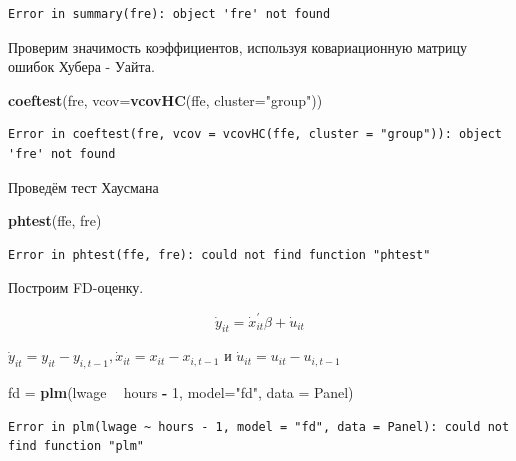 \documentclass[]{book}
\newenvironment{Shaded}{\begin{snugshade}}{\end{snugshade}}
\newcommand{\DataTypeTok}[1]{\textcolor[rgb]{0.13,0.29,0.53}{#1}}
\newcommand{\DecValTok}[1]{\textcolor[rgb]{0.00,0.00,0.81}{#1}}
\newcommand{\KeywordTok}[1]{\textcolor[rgb]{0.13,0.29,0.53}{\textbf{#1}}}
\newcommand{\NormalTok}[1]{#1}
\newcommand{\OperatorTok}[1]{\textcolor[rgb]{0.81,0.36,0.00}{\textbf{#1}}}
\newcommand{\StringTok}[1]{\textcolor[rgb]{0.31,0.60,0.02}{#1}}
\begin{document}
\begin{verbatim}
Error in summary(fre): object 'fre' not found
\end{verbatim}

Проверим значимость коэффициентов, используя ковариационную матрицу ошибок Хубера - Уайта.

\begin{Shaded}
\begin{Highlighting}[]
\KeywordTok{coeftest}\NormalTok{(fre, }\DataTypeTok{vcov=}\KeywordTok{vcovHC}\NormalTok{(ffe, }\DataTypeTok{cluster=}\StringTok{"group"}\NormalTok{))}
\end{Highlighting}
\end{Shaded}

\begin{verbatim}
Error in coeftest(fre, vcov = vcovHC(ffe, cluster = "group")): object 'fre' not found
\end{verbatim}

Проведём тест Хаусмана

\begin{Shaded}
\begin{Highlighting}[]
\KeywordTok{phtest}\NormalTok{(ffe, fre)}
\end{Highlighting}
\end{Shaded}

\begin{verbatim}
Error in phtest(ffe, fre): could not find function "phtest"
\end{verbatim}

Построим FD-оценку.

\begin{equation}
\dot{y}_{i t}=\dot{x}_{i t}^{\prime} \beta+\dot{u}_{i t}
\end{equation}

\(\dot{y}_{i t}=y_{i t}-y_{i, t-1}, \dot{x}_{i t}=x_{i t}-x_{i, t-1}\) и \(\dot{u}_{i t}=u_{i t}-u_{i, t-1}\)

\begin{Shaded}
\begin{Highlighting}[]
\NormalTok{fd =}\StringTok{ }\KeywordTok{plm}\NormalTok{(lwage }\OperatorTok{~}\StringTok{ }\NormalTok{hours }\OperatorTok{-}\StringTok{ }\DecValTok{1}\NormalTok{, }\DataTypeTok{model=}\StringTok{"fd"}\NormalTok{, }\DataTypeTok{data =}\NormalTok{ Panel)}
\end{Highlighting}
\end{Shaded}

\begin{verbatim}
Error in plm(lwage ~ hours - 1, model = "fd", data = Panel): could not find function "plm"
\end{verbatim}
\end{document}
